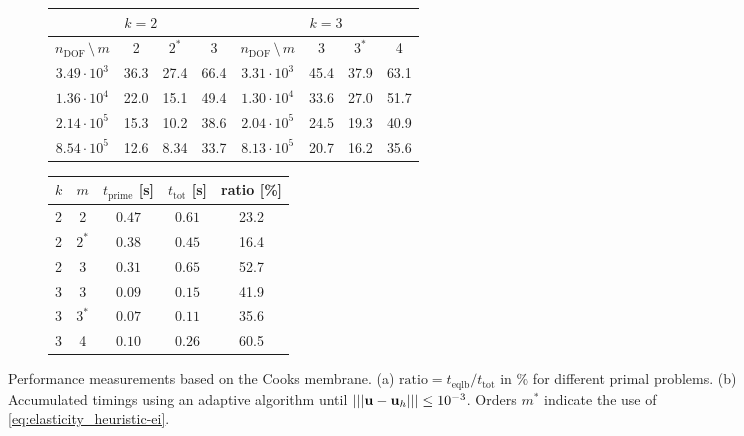 \begin{figure}[]
\centering
    \begin{subfigure}[b]{0.6\textwidth}
        \centering
        \begin{tabular}{@{}c|ccc||c|ccc@{}}
        \toprule
        \multicolumn{4}{c}{$k=2$}    & \multicolumn{4}{c}{$k=3$}    \\ \midrule
        $n_\mathrm{DOF}\,\setminus\, m$ & 2    & $2^*$    & 3    & $n_\mathrm{DOF} \,\setminus\, m$ & 3    & $3^*$    & 4    \\ \midrule
        $3.49 \cdot 10^3$  & 36.3 & 27.4 & 66.4 & $3.31 \cdot 10^3$ & 45.4 & 37.9 & 63.1 \\
        $1.36 \cdot 10^4$  & 22.0 & 15.1 & 49.4 & $1.30 \cdot 10^4$ & 33.6 & 27.0 & 51.7 \\
        $2.14 \cdot 10^5$  & 15.3 & 10.2 & 38.6 & $2.04 \cdot 10^5$ & 24.5 & 19.3 & 40.9 \\
        $8.54 \cdot 10^5$  & 12.6 & 8.34 & 33.7 & $8.13 \cdot 10^5$ & 20.7 & 16.2 & 35.6 \\ \bottomrule
        \end{tabular}
        \vspace{0.2cm}
        \caption{}
        \label{fig:cook_performance-uniform}
    \end{subfigure}
    \hfill
    \begin{subfigure}[b]{0.38\textwidth}
        \centering
        \begin{tabular}{@{}l|c|ccc@{}}
            \toprule
            $k$ & $m$ & $t_\mathrm{prime}$ [s] & $t_\mathrm{tot}$ [s] & ratio [\%] \\ \midrule
            2 & 2     & $0.47$ & $0.61$ & 23.2\\
            2 & $2^*$ & $0.38$ & $0.45$ & 16.4\\
            2 & 3     & $0.31$ & $0.65$ & 52.7 \\ \midrule
            3 & 3     & $0.09$ & $0.15$ & 41.9\\
            3 & $3^*$ & $0.07$ & $0.11$ & 35.6\\
            3 & 4     & $0.10$ & $0.26$ & 60.5\\ \bottomrule
        \end{tabular}
        \caption{}
        \label{fig:cook_performance-adaptive}
    \end{subfigure}
    \caption{Performance measurements based on the Cooks membrane. (a) $\mathrm{ratio} = t_\mathrm{eqlb} / t_\mathrm{tot}$ in $\%$ for different primal problems. (b) Accumulated timings using an adaptive algorithm until $\vert\vert\vert \bm{\mathrm{u}} - \bm{\mathrm{u}}_h \vert\vert\vert \leq 10^{-3}$. Orders $m^*$ indicate the use of \eqref{eq:elasticity_heuristic-ei}.}
    \label{fig:linelast-cook_performance}
\end{figure}

